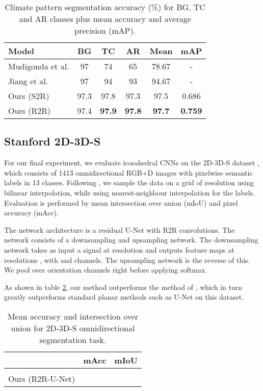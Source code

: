 \documentclass{article}
\begin{document}
\begin{table}[h!]
    \centering
    \begin{tabular}{l c c c c c}
        \toprule
Model & BG & TC & AR & Mean & mAP \\
        \midrule
        {\small Mudigonda et al.}
         & 97 & 74 & 65 & 78.67 & - \\
        {\small Jiang et al.}
         & 97 & 94 & 93 & 94.67 & - \\
        Ours (S2R) & 97.3 & 97.8 & 97.3 & 97.5 & 0.686 \\
        Ours (R2R) & 97.4 & \textbf{97.9} & \textbf{97.8} & \textbf{97.7} & \textbf{0.759} \\
        \bottomrule
    \end{tabular}
    \caption{Climate pattern segmentation accuracy (\%) for BG, TC and AR classes plus mean accuracy and average precision (mAP).}
    \label{tab:climate}
\end{table}


\subsection{Stanford 2D-3D-S}

For our final experiment, we evaluate icosahedral CNNs on the 2D-3D-S dataset \cite{armeniJoint2D3DSemanticData}, which consists of 1413 omnidirectional RGB+D images with pixelwise semantic labels in 13 classes. 
Following \citet{jiangSphericalCNNsUnstructured2018}, we sample the data on a grid of resolution  using bilinear interpolation, while using nearest-neighbour interpolation for the labels.
Evaluation is performed by mean intersection over union (mIoU) and pixel accuracy (mAcc).

The network architecture is a residual U-Net \cite{RFB15a, heDeepResidualLearning2016} with R2R convolutions.
The network consists of a downsampling and upsampling network.
The downsampling network takes as input a signal at resolution  and outputs feature maps at resolutions , with  and  channels.
The upsampling network is the reverse of this.
We pool over orientation channels right before applying softmax.

As shown in table \ref{tab:2d3ds}, our method outperforms the method of \cite{jiangSphericalCNNsUnstructured2018}, which in turn greatly outperforms standard planar methods such as U-Net on this dataset.
\begin{table}[h!]
    \centering
    \begin{tabular}{l c c}
        \toprule
         & mAcc & mIoU \\
        \midrule
        {\small \cite{jiangSphericalCNNsUnstructured2018}}
         &  &  \\
        Ours (R2R-U-Net) &  &  \\
        \bottomrule
    \end{tabular}
    \caption{Mean accuracy and intersection over union for 2D-3D-S omnidirectional segmentation task.}
    \label{tab:2d3ds}
\end{table}
\end{document}
